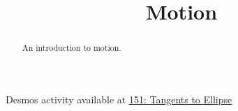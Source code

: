 \documentclass{ximera}
\title{Motion}
\begin{document}
\begin{abstract}
An introduction to motion.
\end{abstract}
\maketitle


\begin{question}  \label{Q:4sdfdsfdellk}

\begin{onlineOnly}
    \begin{center}
\end{center}
\end{onlineOnly}

Desmos activity available at \href{https://www.desmos.com/calculator/jl0nyqwukz}{151: Tangents to Ellipse}

\end{question}
\end{document}
